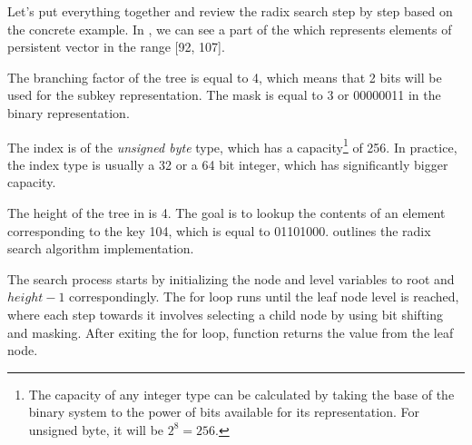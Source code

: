 \begin{figure}
\end{figure}

Let's put everything together and review the radix search step by step based on the concrete example. In , we can see a part of the \rbtree{} which represents elements of persistent vector in the range [92, 107].

The branching factor of the tree is equal to 4, which means that 2 bits will be used for the subkey representation. The mask is equal to 3 or 00000011 in the binary representation.

The index is of the \emph{unsigned byte} type, which has a capacity\footnote{The capacity of any integer type can be calculated by taking the base of the binary system to the power of bits available for its representation. For unsigned byte, it will be $2^8 = 256$.} of 256. In practice, the index type is usually a 32 or a 64 bit integer, which has significantly bigger capacity.

The height of the tree in  is 4. The goal is to lookup the contents of an element corresponding to the key 104, which is equal to 01101000.  outlines the radix search algorithm implementation. 

The search process starts by initializing the node and level variables to root and $height - 1$ correspondingly. The for loop runs until the leaf node level is reached, where each step towards it involves selecting a child node by using bit shifting and masking. After exiting the for loop, function returns the value from the leaf node. 

